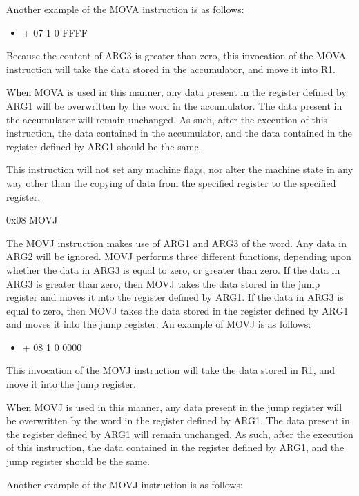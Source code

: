 \documentclass[]{article}
\providecommand{\tightlist}{%
  \setlength{\itemsep}{0pt}\setlength{\parskip}{0pt}}
\begin{document}
Another example of the MOVA instruction is as follows:

\begin{itemize}
\tightlist
\item
  + 07 1 0 FFFF
\end{itemize}

Because the content of ARG3 is greater than zero, this invocation of the
MOVA instruction will take the data stored in the accumulator, and move
it into R1.

When MOVA is used in this manner, any data present in the register
defined by ARG1 will be overwritten by the word in the accumulator. The
data present in the accumulator will remain unchanged. As such, after
the execution of this instruction, the data contained in the
accumulator, and the data contained in the register defined by ARG1
should be the same.

This instruction will not set any machine flags, nor alter the machine
state in any way other than the copying of data from the specified
register to the specified register.

0x08 MOVJ

The MOVJ instruction makes use of ARG1 and ARG3 of the word. Any data in
ARG2 will be ignored. MOVJ performs three different functions, depending
upon whether the data in ARG3 is equal to zero, or greater than zero. If
the data in ARG3 is greater than zero, then MOVJ takes the data stored
in the jump register and moves it into the register defined by ARG1. If
the data in ARG3 is equal to zero, then MOVJ takes the data stored in
the register defined by ARG1 and moves it into the jump register. An
example of MOVJ is as follows:

\begin{itemize}
\tightlist
\item
  + 08 1 0 0000
\end{itemize}

This invocation of the MOVJ instruction will take the data stored in R1,
and move it into the jump register.

When MOVJ is used in this manner, any data present in the jump register
will be overwritten by the word in the register defined by ARG1. The
data present in the register defined by ARG1 will remain unchanged. As
such, after the execution of this instruction, the data contained in the
register defined by ARG1, and the jump register should be the same.

Another example of the MOVJ instruction is as follows:
\end{document}
